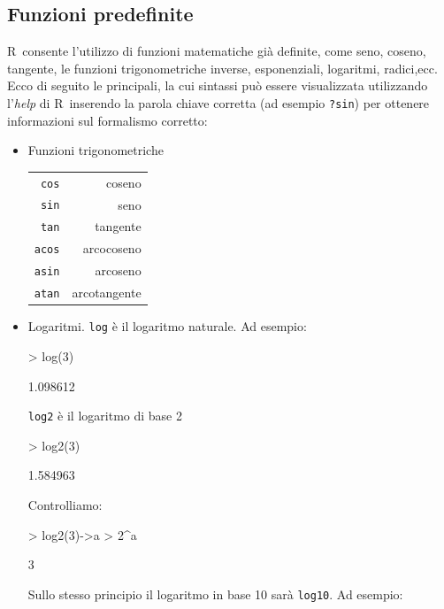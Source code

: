 \documentclass[onecolumn,11pt]{book}
\newcommand{\rpr}{\textsf{R}~}
\begin{document}
\subsection{Funzioni predefinite}  
\rpr consente l'utilizzo di funzioni matematiche gi\`a definite, come seno, coseno, tangente, le funzioni trigonometriche inverse, esponenziali, logaritmi, radici,ecc.
Ecco di seguito le principali, la cui sintassi pu\`o essere visualizzata utilizzando l'\emph {help} di \rpr inserendo la parola chiave corretta (ad esempio \texttt{?sin}) per ottenere informazioni sul formalismo corretto:  
\begin{itemize}
 \item{}
 Funzioni trigonometriche\hfill\vskip10pt
 \begin{tabular}{|r r |}\hline
\texttt{cos}&  coseno\\
\texttt{sin}& seno\\
\texttt{tan}&   tangente\\
\texttt{acos}&   arcocoseno\\
\texttt{asin}&   arcoseno\\
\texttt{atan} &  arcotangente\\
\hline
\end{tabular}
\item{}Logaritmi.\vskip10pt
\texttt{log} \`e il  logaritmo naturale. Ad esempio:
\begin{Schunk}
\begin{Sinput}
> log(3)
\end{Sinput}
\begin{Soutput}
[1] 1.098612
\end{Soutput}
\end{Schunk}
\texttt{log2} \`e il logaritmo di base 2 
\begin{Schunk}
\begin{Sinput}
> log2(3)
\end{Sinput}
\begin{Soutput}
[1] 1.584963
\end{Soutput}
\end{Schunk}
Controlliamo:  
\begin{Schunk}
\begin{Sinput}
> log2(3)->a
> 2^a
\end{Sinput}
\begin{Soutput}
[1] 3
\end{Soutput}
\end{Schunk}
Sullo stesso principio il logaritmo in base 10 sar\`a
\texttt{log10}. Ad
esempio:
\begin{Schunk}

\end{Schunk}
\end{itemize}
\end{document}

